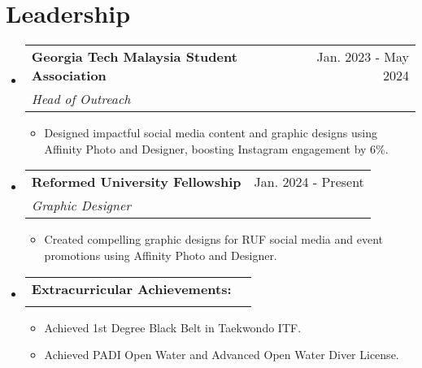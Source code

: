 \documentclass[letterpaper,11pt]{article}
\makeatletter
\newcommand{\resumeItem}[1]{
  \item\small{
    {#1 \vspace{-2pt}}
  }
}
\newcommand{\resumeSubheading}[4]{
  \vspace{-2pt}\item
    \begin{tabular*}{0.97\textwidth}[t]{l@{\extracolsep{\fill}}r}
      \textbf{#1} & #2 \\
      \textit{\small#3} & \textit{\small #4} \\
    \end{tabular*}\vspace{-7pt}
}
\newcommand{\resumeSubHeadingListStart}{\begin{itemize}[leftmargin=0.15in, label={}]}
\newcommand{\resumeSubHeadingListEnd}{\end{itemize}}
\newcommand{\resumeItemListStart}{\begin{itemize}}
\newcommand{\resumeItemListEnd}{\end{itemize}\vspace{-8pt}}
\makeatother
\begin{document}
\section{Leadership}
    \resumeSubHeadingListStart
      \resumeSubheading
      {Georgia Tech Malaysia Student Association}{Jan. 2023 - May 2024}
      {Head of Outreach}{}
      \resumeItemListStart
        \resumeItem{Designed impactful social media content and graphic designs using Affinity Photo and Designer, boosting Instagram engagement by 6\%.}
      \resumeItemListEnd
    \resumeSubHeadingListEnd
    \vspace{-12pt}
    \resumeSubHeadingListStart
      \resumeSubheading
      {Reformed University Fellowship}{Jan. 2024 - Present}
      {Graphic Designer}{}
      \resumeItemListStart
        \resumeItem{Created compelling graphic designs for RUF social media and event promotions using Affinity Photo and Designer.}
      \resumeItemListEnd
    \resumeSubHeadingListEnd
    \vspace{-12pt}
    \resumeSubHeadingListStart
    \vspace{-12pt}
      \resumeSubheading
      {Extracurricular Achievements:}{}
      {}{}
      \resumeItemListStart
      \vspace{-5mm}
        \resumeItem{Achieved 1st Degree Black Belt in Taekwondo ITF.}
        \resumeItem{ Achieved PADI Open Water and Advanced Open Water Diver License.}
      \resumeItemListEnd
    \resumeSubHeadingListEnd
\end{document}
